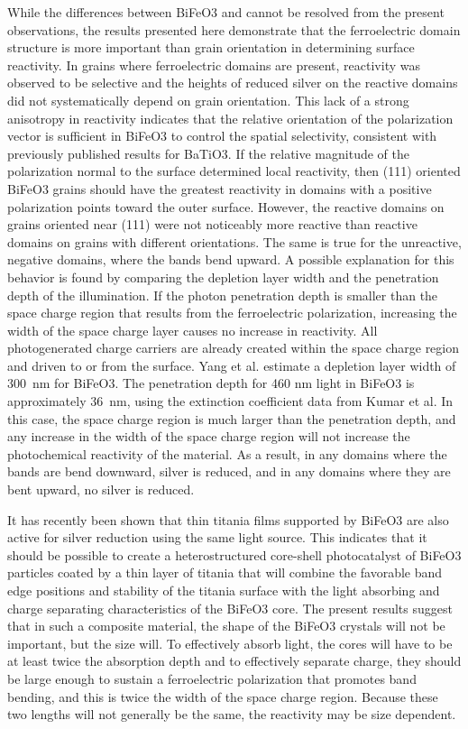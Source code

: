 \documentclass[12pt,%
              twoside,
               letterpaper]{uiothesis}
\begin{document}
While the differences between BiFeO3 and  cannot be resolved from the
present observations, the results presented here demonstrate that the ferroelectric domain
structure is more important than grain orientation in determining surface reactivity. In
grains where ferroelectric domains are present, reactivity was observed to be selective
and the heights of reduced silver on the reactive domains did not systematically depend on
grain orientation. This lack of a strong anisotropy in reactivity indicates that the
relative orientation of the polarization vector is sufficient in BiFeO3 to control
the spatial selectivity, consistent with previously published results for
BaTiO3.\cite{Burbure:2010tt} If the relative magnitude of the polarization normal to
the surface determined local reactivity, then (111) oriented BiFeO3 grains should
have the greatest reactivity in domains with a positive polarization points toward the
outer surface. However, the reactive domains on grains oriented near (111) were not
noticeably more reactive than reactive domains on grains with different orientations. The
same is true for the unreactive, negative domains, where the bands bend upward. A possible
explanation for this behavior is found by comparing the depletion layer width and the
penetration depth of the illumination. If the photon penetration depth is smaller than the
space charge region that results from the ferroelectric polarization, increasing the width
of the space charge layer causes no increase in reactivity. All photogenerated charge
carriers are already created within the space charge region and driven to or from the
surface. Yang et al.\cite{Yang:2009hl} estimate a depletion layer width of
\SI{300}{\nano\meter} for BiFeO3. The penetration depth for 460 nm light in
BiFeO3 is approximately \SI{36}{\nano\meter}, using the extinction coefficient data
from Kumar et al. \cite{Kumar:2008fr} In this case, the space charge region is much larger
than the penetration depth, and any increase in the width of the space charge region will
not increase the photochemical reactivity of the material. As a result, in any domains
where the bands are bend downward, silver is reduced, and in any domains where they are
bent upward, no silver is reduced.

It has recently been shown that thin titania films supported by BiFeO3 are also
active for silver reduction using the same light source.\cite{Zhang:2011cj} This indicates
that it should be possible to create a heterostructured core-shell photocatalyst of
BiFeO3 particles coated by a thin layer of titania that will combine the favorable
band edge positions and stability of the titania surface with the light absorbing and
charge separating characteristics of the BiFeO3 core. The present results suggest
that in such a composite material, the shape of the BiFeO3 crystals will not be
important, but the size will. To effectively absorb light, the cores will have to be at
least twice the absorption depth and to effectively separate charge, they should be large
enough to sustain a ferroelectric polarization that promotes band bending, and this is
twice the width of the space charge region. Because these two lengths will not generally
be the same, the reactivity may be size dependent.
\end{document}
